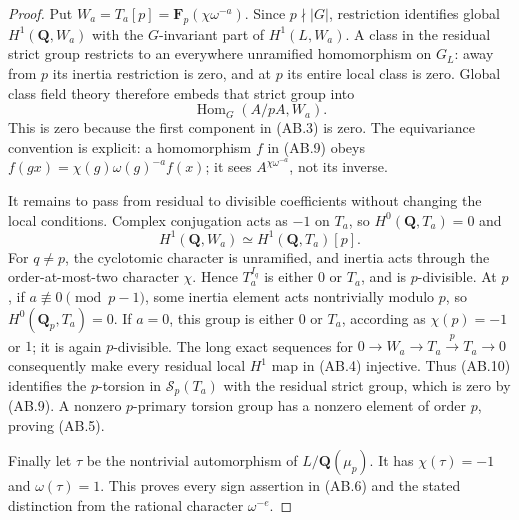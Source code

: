 \begin{proof}
Put $W_a=T_a[p]=\mathbf F_p(\chi\omega^{-a})$.
Since $p\nmid|G|$, restriction identifies global
$H^1(\mathbf Q,W_a)$ with the $G$-invariant part of
$H^1(L,W_a)$.  A class in the residual strict group
restricts to an everywhere unramified homomorphism on
$G_L$: away from $p$ its inertia restriction is zero,
and at $p$ its entire local class is zero.  Global class
field theory therefore embeds that strict group into
\[
                 \operatorname{Hom}_G(A/pA,W_a).          \tag{AB.9}
\]
This is zero because the first component in (AB.3) is zero.
The equivariance convention is explicit: a homomorphism
$f$ in (AB.9) obeys $f(gx)=\chi(g)\omega(g)^{-a}f(x)$;
it sees $A^{\chi\omega^{-a}}$, not its inverse.

It remains to pass from residual to divisible coefficients
without changing the local conditions.  Complex conjugation
acts as $-1$ on $T_a$, so $H^0(\mathbf Q,T_a)=0$ and
\[
              H^1(\mathbf Q,W_a)\simeq
                       H^1(\mathbf Q,T_a)[p].            \tag{AB.10}
\]
For $q\ne p$, the cyclotomic character is unramified, and
inertia acts through the order-at-most-two character $\chi$.
Hence $T_a^{I_q}$ is either $0$ or $T_a$, and is
$p$-divisible.  At $p$, if $a\not\equiv0\pmod{p-1}$,
some inertia element acts nontrivially modulo $p$, so
$H^0(\mathbf Q_p,T_a)=0$.  If $a=0$, this group is
either $0$ or $T_a$, according as $\chi(p)=-1$ or $1$;
it is again $p$-divisible.  The long exact sequences for
$0\to W_a\to T_a\xrightarrow{p}T_a\to0$ consequently
make every residual local $H^1$ map in (AB.4) injective.
Thus (AB.10) identifies the $p$-torsion in
$\mathcal S_p(T_a)$ with the residual strict group,
which is zero by (AB.9).  A nonzero $p$-primary torsion
group has a nonzero element of order $p$, proving (AB.5).

Finally let $\tau$ be the nontrivial automorphism of
$L/\mathbf Q(\mu_p)$.  It has $\chi(\tau)=-1$ and
$\omega(\tau)=1$.  This proves every sign assertion
in (AB.6) and the stated distinction from the rational
character $\omega^{-e}$.
\end{proof}

